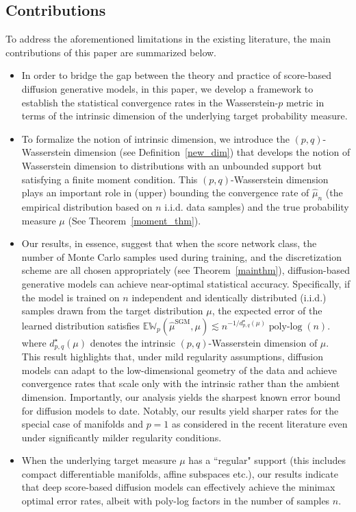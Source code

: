 \documentclass[12pts]{article}
\newcommand{\hmu}{\hat{\mu}}
\newcommand{\E}{\mathbb{E}}
\newcommand{\fW}{\mathbb{W}}
\begin{document}
\subsection{Contributions} To address the aforementioned limitations in the existing literature, the main contributions of this paper are summarized below.
\begin{itemize}
\item In order to bridge the gap between the theory and practice of score-based diffusion generative models, in this paper, we develop a framework to establish the statistical convergence rates in the Wasserstein-$p$ metric in terms of the intrinsic dimension of the underlying target probability measure. 
    \item To formalize the notion of intrinsic dimension,  we introduce the $(p,q)$-Wasserstein dimension (see Definition~\ref{new_dim}) that develops the notion of Wasserstein dimension \citep{weed2019sharp} to distributions with an unbounded support but satisfying a finite moment condition. This $(p,q)$-Wasserstein dimension plays an important role in (upper) bounding the convergence rate of $\hmu_n$ (the empirical distribution based on $n$ i.i.d. data samples) and the true probability measure $\mu$ (See Theorem~\ref{moment_thm}). 
    \item Our results, in essence, suggest that when the score network class, the number of Monte Carlo samples used during training, and the discretization scheme are all chosen appropriately (see Theorem~\ref{mainthm}), diffusion-based generative models can achieve near-optimal statistical accuracy. Specifically, if the model is trained on $n$ independent and identically distributed (i.i.d.) samples drawn from the target distribution $\mu$, the expected error of the learned distribution satisfies $\E \fW_p\left(\hmu^{\text{SGM}}, \mu\right) \lesssim n^{-1/d^\star_{p,q}(\mu)} \operatorname{poly-log}(n)$. 
    where $d^\star_{p,q}(\mu)$ denotes the intrinsic $(p, q)$-Wasserstein dimension of $\mu$. This result highlights that, under mild regularity assumptions, diffusion models can adapt to the low-dimensional geometry of the data and achieve convergence rates that scale only with the intrinsic rather than the ambient dimension. Importantly, our analysis yields the sharpest known error bound for diffusion models to date. Notably, our results yield sharper rates for the special case of manifolds and $p=1$ as considered in the recent literature \citep{pmlr-v238-tang24a, oko2023diffusion} even under significantly milder regularity conditions.
    \item When the underlying target measure $\mu$ has a ``regular" support (this includes compact differentiable manifolds, affine subspaces etc.), our results indicate that deep score-based diffusion models can effectively achieve the minimax optimal error rates, albeit with poly-log factors in the number of samples $n$.
\end{itemize}
\end{document}
